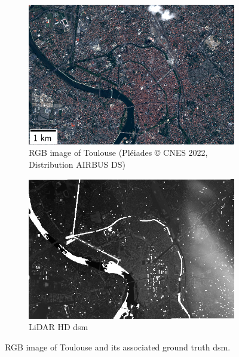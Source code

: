 \begin{figure}
    \centering
    \begin{subfigure}[t]{0.48\linewidth}
        \flushleft
        \includegraphics[width=\linewidth]{Images/Chap_6/miniature_Toulouse.png}
        \caption{RGB image of Toulouse (Pléiades © CNES 2022, Distribution AIRBUS DS)}
        \label{fig:miniature_Toulouse_rgb}
    \end{subfigure}\hfill
    \begin{subfigure}[t]{0.48\linewidth}
        \flushright
        \includegraphics[width=\linewidth]{Images/Chap_6/miniature_Toulouse_gt.png}
        \caption{LiDAR HD \acrshort{dsm}}
        \label{fig:miniature_Toulouse_gt}
    \end{subfigure}
    \caption{RGB image of Toulouse and its associated ground truth \acrshort{dsm}.}
    \label{fig:miniature_Toulouse}
\end{figure}

